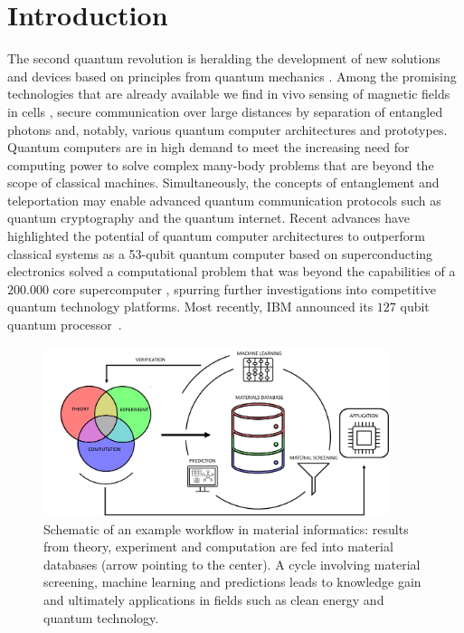 \documentclass[superscriptaddress,unsortedaddress,
 amsmath,amssymb,
 aps,
]{revtex4-2}
\begin{document}
\section*{Introduction}
The second quantum revolution is heralding the development of new solutions and devices based on principles from quantum mechanics \cite{Acin2018}. Among the promising technologies that are already available we find in vivo sensing of magnetic fields in cells \cite{Lesage_2013}, secure communication over large distances by separation of entangled photons \cite{Ursin2007} and, notably, various quantum computer architectures and prototypes. 
Quantum computers are in high demand to meet the increasing need for computing power to solve complex many-body problems that are beyond the scope of classical machines.   
Simultaneously, the concepts of entanglement and teleportation may enable advanced quantum communication protocols such as quantum cryptography and the quantum internet.  
Recent advances have highlighted the potential of quantum computer architectures to outperform classical systems as a 53-qubit quantum computer based on superconducting electronics solved a computational problem that was beyond the capabilities of a $200.000$ core supercomputer \cite{Arute_2019}, spurring further investigations into competitive quantum technology platforms. Most recently, IBM announced its $127$ qubit quantum processor~\cite{IBM2021}.

\begin{figure}[t]
    \centering
    \includegraphics[width=0.9\textwidth]{figures/ht-workflow-new-2.png}
    \caption{Schematic of an example workflow in material informatics: results from theory, experiment and computation are fed into material databases (arrow pointing to the center). A cycle involving material screening, machine learning and predictions leads to knowledge gain and ultimately applications in fields such as clean energy and quantum technology. 
    }
    \label{fig:ht-workflow}
\end{figure}
\end{document}

